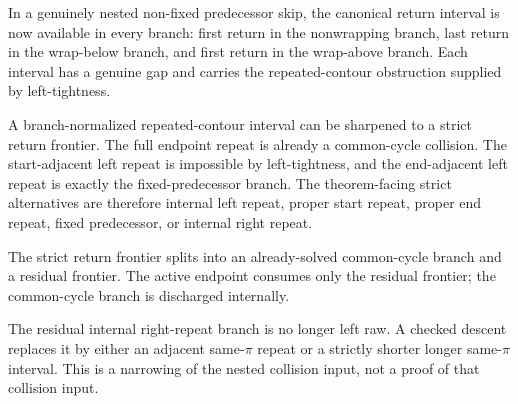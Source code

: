 \begin{theorem}
  \label{thm:skip-branch-normalized-return}
  \leanok
  In a genuinely nested non-fixed predecessor skip, the canonical return
  interval is now available in every branch: first return in the nonwrapping
  branch, last return in the wrap-below branch, and first return in the
  wrap-above branch.  Each interval has a genuine gap and carries the
  repeated-contour obstruction supplied by left-tightness.
\end{theorem}

\begin{theorem}
  \label{thm:skip-strict-return-frontier}
  \leanok
  A branch-normalized repeated-contour interval can be sharpened to a strict
  return frontier.  The full endpoint repeat is already a common-cycle
  collision.  The start-adjacent left repeat is impossible by left-tightness,
  and the end-adjacent left repeat is exactly the fixed-predecessor branch.
  The theorem-facing strict alternatives are therefore internal left repeat,
  proper start repeat, proper end repeat, fixed predecessor, or internal
  right repeat.
\end{theorem}

\begin{theorem}
  \label{thm:skip-residual-return-frontier}
  \leanok
  The strict return frontier splits into an already-solved common-cycle branch
  and a residual frontier.  The active endpoint consumes only the residual
  frontier; the common-cycle branch is discharged internally.
\end{theorem}

\begin{theorem}
  \label{thm:skip-descended-residual}
  \leanok
  The residual internal right-repeat branch is no longer left raw.  A checked
  descent replaces it by either an adjacent same-\(\pi\) repeat or a strictly
  shorter longer same-\(\pi\) interval.  This is a narrowing of the nested
  collision input, not a proof of that collision input.
\end{theorem}

